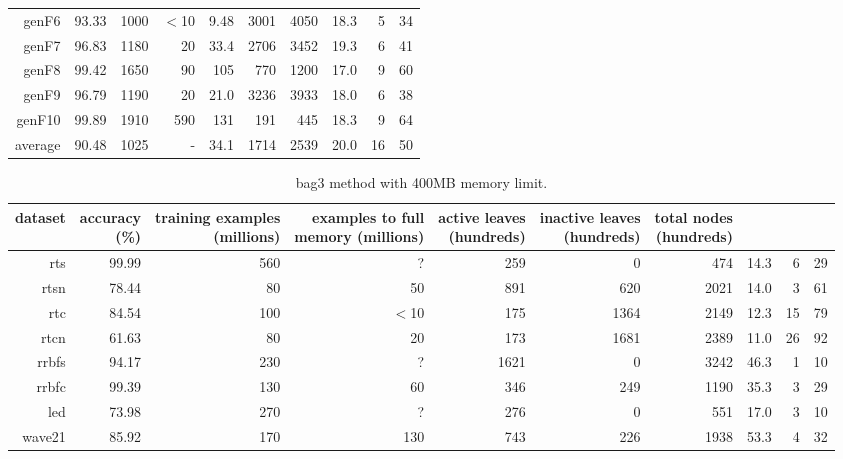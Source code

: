 \begin{table}
\begin{tabular}{|r|r|r|r|r|r|r|r|r|r|}
{\sc genF6} & 93.33 & 1000 & $<$10 & 9.48 & 3001 & 4050 & 18.3 & 5 & 34 \\
{\sc genF7} & 96.83 & 1180 & 20 & 33.4 & 2706 & 3452 & 19.3 & 6 & 41 \\
{\sc genF8} & 99.42 & 1650 & 90 & 105 & 770 & 1200 & 17.0 & 9 & 60 \\
{\sc genF9} & 96.79 & 1190 & 20 & 21.0 & 3236 & 3933 & 18.0 & 6 & 38 \\
{\sc genF10} & 99.89 & 1910 & 590 & 131 & 191 & 445 & 18.3 & 9 & 64 \\
\hline
average & 90.48 & 1025 &  -  & 34.1 & 1714 & 2539 & 20.0 & 16 & 50 \\
\hline
\end{tabular}
\end{table}
\clearpage
\begin{table}
\caption{{\sc bag3} method with 400MB memory limit.}
\label{tab:bag3-400MB}
\centering
\begin{tabular}{|r|r|r|r|r|r|r|r|r|r|}
\hline
dataset	&
\rotatebox{90}{\parbox{9em}{accuracy\\(\%)}} &
\rotatebox{90}{\parbox{9em}{training examples\\(millions)}} &
\rotatebox{90}{\parbox{9em}{examples to full\\memory (millions)}} &
\rotatebox{90}{\parbox{9em}{active leaves\\(hundreds)}} &
\rotatebox{90}{\parbox{9em}{inactive leaves\\(hundreds)}} &
\rotatebox{90}{\parbox{9em}{total nodes\\(hundreds)}} &
\rotatebox{90}{\parbox{9em}{average tree depth}}	&
\rotatebox{90}{\parbox{9em}{training speed (\%)}} &
\rotatebox{90}{\parbox{9em}{prediction speed (\%)}} \\
\hline
{\sc rts} & 99.99 & 560 & ? & 259 & 0 & 474 & 14.3 & 6 & 29 \\
{\sc rtsn} & 78.44 & 80 & 50 & 891 & 620 & 2021 & 14.0 & 3 & 61 \\
{\sc rtc} & 84.54 & 100 & $<$10 & 175 & 1364 & 2149 & 12.3 & 15 & 79 \\
{\sc rtcn} & 61.63 & 80 & 20 & 173 & 1681 & 2389 & 11.0 & 26 & 92 \\
{\sc rrbfs} & 94.17 & 230 & ? & 1621 & 0 & 3242 & 46.3 & 1 & 10 \\
{\sc rrbfc} & 99.39 & 130 & 60 & 346 & 249 & 1190 & 35.3 & 3 & 29 \\
{\sc led} & 73.98 & 270 & ? & 276 & 0 & 551 & 17.0 & 3 & 10 \\
{\sc wave21} & 85.92 & 170 & 130 & 743 & 226 & 1938 & 53.3 & 4 & 32 \\

\end{tabular}
\end{table}
